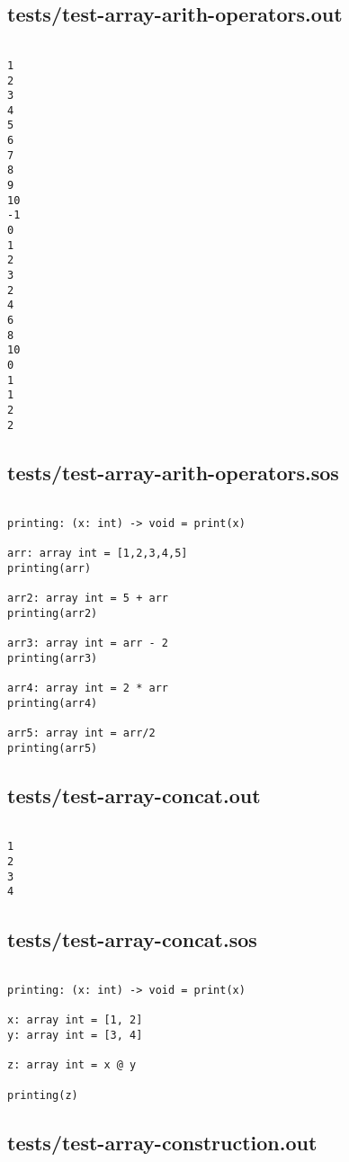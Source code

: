 \documentclass[main.tex]{subfiles}
\begin{document}
\subsection{tests/test-array-arith-operators.out}

\begin{lstlisting}

1
2
3
4
5
6
7
8
9
10
-1
0
1
2
3
2
4
6
8
10
0
1
1
2
2
\end{lstlisting}

\subsection{tests/test-array-arith-operators.sos}

\begin{lstlisting}

printing: (x: int) -> void = print(x)

arr: array int = [1,2,3,4,5]
printing(arr)

arr2: array int = 5 + arr
printing(arr2)

arr3: array int = arr - 2
printing(arr3)

arr4: array int = 2 * arr
printing(arr4)

arr5: array int = arr/2
printing(arr5)
\end{lstlisting}

\subsection{tests/test-array-concat.out}

\begin{lstlisting}

1
2
3
4
\end{lstlisting}

\subsection{tests/test-array-concat.sos}

\begin{lstlisting}

printing: (x: int) -> void = print(x)

x: array int = [1, 2]
y: array int = [3, 4]

z: array int = x @ y

printing(z)
\end{lstlisting}

\subsection{tests/test-array-construction.out}
\end{document}

